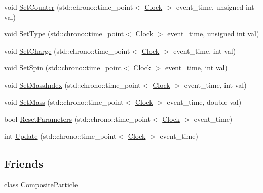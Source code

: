 \begin{DoxyCompactItemize}
\item 
void \hyperlink{class_elementary_particle_a141316fd968cce8ecc5aa11ce0757d63}{Set\+Counter} (std\+::chrono\+::time\+\_\+point$<$ \hyperlink{universe_8h_a0ef8d951d1ca5ab3cfaf7ab4c7a6fd80}{Clock} $>$ event\+\_\+time, unsigned int val)
\item 
void \hyperlink{class_elementary_particle_a37d7718faf6be68d4374bcc56816f30a}{Set\+Type} (std\+::chrono\+::time\+\_\+point$<$ \hyperlink{universe_8h_a0ef8d951d1ca5ab3cfaf7ab4c7a6fd80}{Clock} $>$ event\+\_\+time, unsigned int val)
\item 
void \hyperlink{class_elementary_particle_abbc6d3c58509c4121df55bfef716d2f1}{Set\+Charge} (std\+::chrono\+::time\+\_\+point$<$ \hyperlink{universe_8h_a0ef8d951d1ca5ab3cfaf7ab4c7a6fd80}{Clock} $>$ event\+\_\+time, int val)
\item 
void \hyperlink{class_elementary_particle_a437fa86d88157314b84662b158d52353}{Set\+Spin} (std\+::chrono\+::time\+\_\+point$<$ \hyperlink{universe_8h_a0ef8d951d1ca5ab3cfaf7ab4c7a6fd80}{Clock} $>$ event\+\_\+time, int val)
\item 
void \hyperlink{class_elementary_particle_a8a3b91409772f4091a782624a34024e7}{Set\+Mass\+Index} (std\+::chrono\+::time\+\_\+point$<$ \hyperlink{universe_8h_a0ef8d951d1ca5ab3cfaf7ab4c7a6fd80}{Clock} $>$ event\+\_\+time, int val)
\item 
void \hyperlink{class_elementary_particle_a778ff8188ecb369e533521ed4f94b034}{Set\+Mass} (std\+::chrono\+::time\+\_\+point$<$ \hyperlink{universe_8h_a0ef8d951d1ca5ab3cfaf7ab4c7a6fd80}{Clock} $>$ event\+\_\+time, double val)
\item 
bool \hyperlink{class_elementary_particle_ac0f85f34bdfc1d42324201eb7c38e85e}{Reset\+Parameters} (std\+::chrono\+::time\+\_\+point$<$ \hyperlink{universe_8h_a0ef8d951d1ca5ab3cfaf7ab4c7a6fd80}{Clock} $>$ event\+\_\+time)
\item 
int \hyperlink{class_elementary_particle_abf5114c3d032bc9511a14aa7368ec450}{Update} (std\+::chrono\+::time\+\_\+point$<$ \hyperlink{universe_8h_a0ef8d951d1ca5ab3cfaf7ab4c7a6fd80}{Clock} $>$ event\+\_\+time)
\end{DoxyCompactItemize}
\subsection*{Friends}
\begin{DoxyCompactItemize}
\item 
class \hyperlink{class_elementary_particle_a8be5cf46db5f9876c49d58e4ab84044b}{Composite\+Particle}
\end{DoxyCompactItemize}
